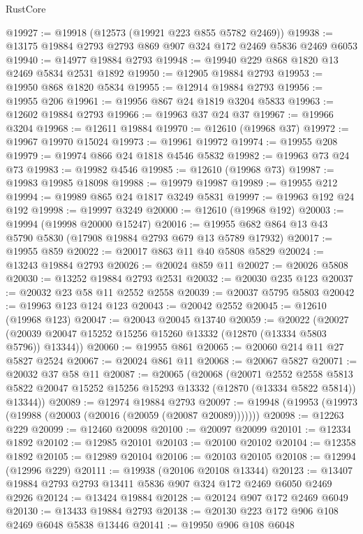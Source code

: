 \begin{lexlean}{RustCore}
\begin{coremodule}
@19927 := @19918 (@12573 (@19921 @223 @855 @5782 @2469))
@19938 := @13175 @19884 @2793 @2793 @869 @907 @324 @172 @2469 @5836 @2469 @6053
@19940 := @14977 @19884 @2793
@19948 := @19940 @229 @868 @1820 @13 @2469 @5834 @2531 @1892
@19950 := @12905 @19884 @2793
@19953 := @19950 @868 @1820 @5834
@19955 := @12914 @19884 @2793
@19956 := @19955 @206
@19961 := @19956 @867 @24 @1819 @3204 @5833
@19963 := @12602 @19884 @2793
@19966 := @19963 @37 @24 @37
@19967 := @19966 @3204
@19968 := @12611 @19884
@19970 := @12610 (@19968 @37)
@19972 := @19967 @19970 @15024
@19973 := @19961 @19972
@19974 := @19955 @208
@19979 := @19974 @866 @24 @1818 @4546 @5832
@19982 := @19963 @73 @24 @73
@19983 := @19982 @4546
@19985 := @12610 (@19968 @73)
@19987 := @19983 @19985 @18098
@19988 := @19979 @19987
@19989 := @19955 @212
@19994 := @19989 @865 @24 @1817 @3249 @5831
@19997 := @19963 @192 @24 @192
@19998 := @19997 @3249
@20000 := @12610 (@19968 @192)
@20003 := @19994 (@19998 @20000 @15247)
@20016 := @19955 @682 @864 @13 @43 @5790 @5830 (@17908 @19884 @2793 @679 @13 @5789 @17932)
@20017 := @19955 @859
@20022 := @20017 @863 @11 @40 @5808 @5829
@20024 := @13243 @19884 @2793
@20026 := @20024 @859 @11
@20027 := @20026 @5808
@20030 := @13252 @19884 @2793 @2531
@20032 := @20030 @235 @123
@20037 := @20032 @23 @58 @11 @2552 @2558
@20039 := @20037 @5795 @5803
@20042 := @19963 @123 @124 @123
@20043 := @20042 @2552
@20045 := @12610 (@19968 @123)
@20047 := @20043 @20045 @13740
@20059 := @20022
    (@20027 (@20039 @20047 @15252 @15256 @15260 @13332 (@12870 (@13334 @5803 @5796)) @13344))
@20060 := @19955 @861
@20065 := @20060 @214 @11 @27 @5827 @2524
@20067 := @20024 @861 @11
@20068 := @20067 @5827
@20071 := @20032 @37 @58 @11
@20087 := @20065
    (@20068
      (@20071
        @2552
        @2558
        @5813
        @5822
        @20047
        @15252
        @15256
        @15293
        @13332
        (@12870 (@13334 @5822 @5814))
        @13344))
@20089 := @12974 @19884 @2793
@20097 := @19948 (@19953 (@19973 (@19988 (@20003 (@20016 (@20059 (@20087 @20089)))))))
@20098 := @12263 @229
@20099 := @12460 @20098
@20100 := @20097 @20099
@20101 := @12334 @1892
@20102 := @12985 @20101
@20103 := @20100 @20102
@20104 := @12358 @1892
@20105 := @12989 @20104
@20106 := @20103 @20105
@20108 := @12994 (@12996 @229)
@20111 := @19938 (@20106 @20108 @13344)
@20123 := @13407 @19884 @2793 @2793 @13411 @5836 @907 @324 @172 @2469 @6050 @2469 @2926
@20124 := @13424 @19884
@20128 := @20124 @907 @172 @2469 @6049
@20130 := @13433 @19884 @2793
@20138 := @20130 @223 @172 @906 @108 @2469 @6048 @5838 @13446
@20141 := @19950 @906 @108 @6048

\end{coremodule}
\end{lexlean}
